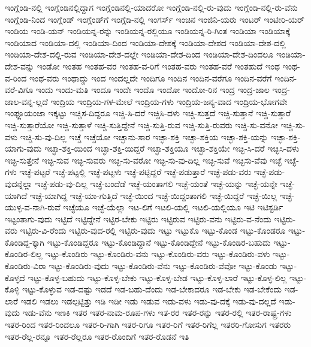 {ಇಂಗ್ಲೆಂಡಿ-ನಲ್ಲಿ
ಇಂಗ್ಲೆಂಡಿನಲ್ಲಿದ್ದಾಗ
ಇಂಗ್ಲೆಂಡಿನಲ್ಲಿ-ಯಾದರೋ
ಇಂಗ್ಲೆಂಡಿ-ನಲ್ಲಿ-ರು-ವುದು
ಇಂಗ್ಲೆಂಡಿ-ನಲ್ಲಿ-ರು-ವೆನು
ಇಂಗ್ಲೆಂಡಿ-ನಿಂದ
ಇಂಗ್ಲೆಂಡ್
ಇಂಗ್ಲೆಂಡ್‌ಗೆ
ಇಂಗ್ಲೆಡಿ-ನಲ್ಲಿ
ಇಂಗರ್ಸ್
ಇಂಚಿನ
ಇಂಜಿನಿ-ಯರು
ಇಂಟರ್
ಇಂಟೀರಿ-ಯರ್‌
ಇಂಡಿಯ
ಇಂಡಿ-ಯನ್
ಇಂಡಿಯನ್ನ-ರನ್ನು
ಇಂಡಿಯನ್ನ-ರಲ್ಲಿಯೂ
ಇಂಡಿಯನ್ನ-ರಿ-ಗಿಂತ
ಇಂಡಿಯಾ
ಇಂಡಿಯಾಕ್ಕೆ
ಇಂಡಿಯಾದ
ಇಂಡಿಯಾ-ದಲ್ಲಿ
ಇಂಡಿಯಾ-ದಿಂದ
ಇಂಡಿಯಾ-ದೇಶಕ್ಕೆ
ಇಂಡಿಯಾ-ದೇಶದ
ಇಂಡಿಯಾ-ದೇಶ-ದಲ್ಲಿ
ಇಂಡಿಯಾ-ದೇಶ-ದಲ್ಲಿ-ರುವ
ಇಂಡಿಯಾ-ದೇಶ-ದಲ್ಲೇ
ಇಂಡಿಯಾ-ದೇಶ-ದಿಂದ
ಇಂಡಿಯಾ-ದೇಶ-ದಿಂದಲೂ
ಇಂಡಿಯಾ-ದೇಶ-ವನ್ನು
ಇಂಡೋ
ಇಂತಹ
ಇಂತಹ-ವರ
ಇಂತಹ-ವ-ರಿಗೆ
ಇಂತಹ-ವರು
ಇಂತಹ-ವರೆ
ಇಂತಹುದೆ
ಇಂಥ
ಇಂಥ-ವ-ರಿಂದ
ಇಂಥ-ವರು
ಇಂಥಾದ್ದು
ಇಂದ
ಇಂದಲ್ಲದೇ
ಇಂದಿಗೂ
ಇಂದಿನ
ಇಂದಿನ-ವರೆಗೂ
ಇಂದಿನ-ವರೆಗೆ
ಇಂದಿನ-ವರೆ-ವಿಗೂ
ಇಂದು
ಇಂದು-ಮತಿ
ಇಂದೂ
ಇಂದೇ
ಇಂದೊ
ಇಂದೋ
ಇಂದೋ-ರಿನ
ಇಂದ್ರ
ಇಂದ್ರ-ಜಾಲ
ಇಂದ್ರ-ಜಾಲ-ವನ್ನ-ಲ್ಲದೆ
ಇಂದ್ರಿಯ
ಇಂದ್ರಿಯ-ಗಳ-ಮೇಲೆ
ಇಂದ್ರಿಯ-ಗಳು
ಇಂದ್ರಿಯ-ಜನ್ಯ-ವಾದ
ಇಂದ್ರಿಯ-ಭೋಗವೇ
ಇಂಫ್ಲೂಯಂಜಾ
ಇಕ್ಕಟ್ಟು
ಇಚ್ಚಿಸ-ದಿದ್ದರೂ
ಇಚ್ಚಿ-ಸಿ-ದರೆ
ಇಚ್ಚಿಸಿ-ದಳು
ಇಚ್ಚಿ-ಸುತ್ತದೆ
ಇಚ್ಚಿ-ಸುತ್ತಾನೆ
ಇಚ್ಚಿ-ಸುತ್ತಾರೆ
ಇಚ್ಚಿ-ಸುತ್ತಾರೆಯೋ
ಇಚ್ಚಿ-ಸುತ್ತಾಳೆ
ಇಚ್ಚಿ-ಸುತ್ತಿದ್ದೇನೆ
ಇಚ್ಚಿ-ಸುತ್ತಿ-ರುವ
ಇಚ್ಚಿ-ಸುತ್ತಿ-ರುವರು
ಇಚ್ಚಿ-ಸು-ವನೋ
ಇಚ್ಚಿ-ಸು-ವಳು
ಇಚ್ಚಿ-ಸು-ವು-ದಿಲ್ಲ
ಇಚ್ಚೆ
ಇಚ್ಚೆಯೋ
ಇಚ್ಛಾನು-ಸಾರ
ಇಚ್ಛಾ-ಶಕ್ತಿ
ಇಚ್ಛಾ-ಶಕ್ತಿಯ
ಇಚ್ಛಾ-ಶಕ್ತಿ-ಯನ್ನು
ಇಚ್ಛಾ-ಶಕ್ತಿ-ಯಾಗು-ವುದು
ಇಚ್ಛಾ-ಶಕ್ತಿ-ಯಿಂದ
ಇಚ್ಛಾ-ಶಕ್ತಿ-ಯಿದ್ದರೆ
ಇಚ್ಛಾ-ಶಕ್ತಿಯೂ
ಇಚ್ಛಾ-ಶಕ್ತಿಯೇ
ಇಚ್ಛಿ-ಸಿ-ದರೆ
ಇಚ್ಛಿಸಿ-ದಳು
ಇಚ್ಛಿ-ಸುತ್ತೇನೆ
ಇಚ್ಛಿ-ಸುವ
ಇಚ್ಛಿ-ಸುವರು
ಇಚ್ಛಿ-ಸು-ವರೋ
ಇಚ್ಛಿ-ಸು-ವು-ದಿಲ್ಲ
ಇಚ್ಛಿ-ಸುವೆ
ಇಚ್ಛಿಸು-ವೆವು
ಇಚ್ಛೆ
ಇಚ್ಛೆ-ಗಳು
ಇಚ್ಛೆ-ಪಟ್ಟರೆ
ಇಚ್ಛೆ-ಪಟ್ಟಲ್ಲಿ
ಇಚ್ಛೆ-ಪಟ್ಟಳು
ಇಚ್ಛೆ-ಪಟ್ಟಿದ್ದರೆ
ಇಚ್ಛೆ-ಪಡುತ್ತಾರೆ
ಇಚ್ಛೆ-ಪಡು-ವರು
ಇಚ್ಛೆ-ಪಡು-ವುದನ್ನೆಲ್ಲಾ
ಇಚ್ಛೆ-ಪಡು-ವು-ದಿಲ್ಲ
ಇಚ್ಛೆ-ಬಂದೆಡೆ
ಇಚ್ಛೆ-ಯಂತಾಗಲಿ
ಇಚ್ಛೆ-ಯಂತೆ
ಇಚ್ಛೆ-ಯನ್ನು
ಇಚ್ಛೆ-ಯನ್ನೇ
ಇಚ್ಛೆ-ಯಾಗಿದೆ
ಇಚ್ಛೆ-ಯಾಗಿದ್ದ
ಇಚ್ಛೆ-ಯಾ-ಗುತ್ತಿದೆ
ಇಚ್ಛೆ-ಯಿಂದ
ಇಚ್ಛೆ-ಯಿದ್ದಂತಾಗಲಿ
ಇಚ್ಛೆ-ಯಿದ್ದರೆ
ಇಚ್ಛೆ-ಯಿಲ್ಲ
ಇಚ್ಛೆ-ಯುಳ್ಳ-ವ-ನಾಗಿ-ರುವೆ
ಇಚ್ಛೆಯೂ
ಇಚ್ಛೆ-ಯೆಲ್ಲಾ
ಇಟ-ಲಿಗೆ
ಇಟಲಿ-ಯಲ್ಲಿ
ಇಟಲಿ-ಯಲ್ಲಿಯೂ
ಇಟಿ
ಇಟಿಸ್ಟರ್ಡಿ
ಇಟ್ಟಂತಾಗು-ವುದು
ಇಟ್ಟಿದೆ
ಇಟ್ಟಿದ್ದೇನೆ
ಇಟ್ಟಿರ-ಬೇಕು
ಇಟ್ಟಿರು
ಇಟ್ಟಿರುವ
ಇಟ್ಟಿರು-ವನು
ಇಟ್ಟಿರು-ವ-ನೆಂದು
ಇಟ್ಟಿರು-ವರು
ಇಟ್ಟಿರು-ವಿ-ರೆಂದು
ಇಟ್ಟಿರು-ವುದ-ರಲ್ಲಿ
ಇಟ್ಟಿರು-ವುದು
ಇಟ್ಟು
ಇಟ್ಟುಕೊ
ಇಟ್ಟು-ಕೊಂಡ
ಇಟ್ಟು-ಕೊಂಡರೂ
ಇಟ್ಟು-ಕೊಂಡಿದ್ದ-ಕ್ಕಾಗಿ
ಇಟ್ಟು-ಕೊಂಡಿದ್ದರೂ
ಇಟ್ಟು-ಕೊಂಡಿದ್ದಾನೆ
ಇಟ್ಟು-ಕೊಂಡಿದ್ದೇನೆ
ಇಟ್ಟು-ಕೊಂಡಿರ-ಬಹುದು
ಇಟ್ಟು-ಕೊಂಡಿರ-ಲಿಲ್ಲ
ಇಟ್ಟು-ಕೊಂಡಿರು
ಇಟ್ಟು-ಕೊಂಡಿರು-ವನು
ಇಟ್ಟು-ಕೊಂಡಿರು-ವರು
ಇಟ್ಟು-ಕೊಂಡಿರು-ವಳು
ಇಟ್ಟು-ಕೊಂಡಿರು-ವಿರಾ
ಇಟ್ಟು-ಕೊಂಡಿರು-ವುದು
ಇಟ್ಟು-ಕೊಂಡಿರು-ವೆನು
ಇಟ್ಟು-ಕೊಂಡಿರು-ವೆವೋ
ಇಟ್ಟು-ಕೊಂಡು
ಇಟ್ಟು-ಕೊಳ್ಳದೆ
ಇಟ್ಟು-ಕೊಳ್ಳ-ಬಹುದು
ಇಟ್ಟು-ಕೊಳ್ಳ-ಬೇಕು
ಇಟ್ಟು-ಕೊಳ್ಳ-ಬೇಡ
ಇಟ್ಟು-ಕೊಳ್ಳ-ಲಾರೆ
ಇಟ್ಟು-ಕೊಳ್ಳ-ಲಿಲ್ಲ
ಇಟ್ಟು-ಕೊಳ್ಳಿ
ಇಟ್ಟು-ಕೊಳ್ಳುವ
ಇಡ-ದಷ್ಟು
ಇಡದೆ
ಇಡ-ಬಹು-ದೆಂದು
ಇಡ-ಬೇಕಾದರೂ
ಇಡ-ಬೇಕು
ಇಡ-ಬೇಕೆಂದು
ಇಡ-ಲಾರೆ
ಇಡಲಿ
ಇಡಲು
ಇಡಲ್ಪಟ್ಟಿತ್ತು
ಇಡಿ
ಇಡೀ
ಇಡು
ಇಡುವ
ಇಡು-ವಳು
ಇಡು-ವು-ದಕ್ಕೆ
ಇಡು-ವು-ದಲ್ಲದೆ
ಇಡು-ವುದು
ಇಡು-ವೆನು
ಇಣಕಿ
ಇತರ
ಇತರ-ನಾಮ-ರೂಪ-ಗಳು
ಇತ-ರರ
ಇತರ-ರನ್ನು
ಇತರ-ರಲ್ಲಿ
ಇತರ-ರಾಷ್ಟ್ರ-ಗಳು
ಇತರ-ರಿಂದ
ಇತರ-ರಿಂದಲೂ
ಇತರ-ರಿ-ಗಾಗಿ
ಇತರ-ರಿಗೂ
ಇತರ-ರಿಗೆ
ಇತರ-ರಿಗೆಲ್ಲ
ಇತರರಿ-ಗೋಸುಗ
ಇತರರು
ಇತರ-ರೆಲ್ಲ-ರನ್ನೂ
ಇತರ-ರೆಲ್ಲರೂ
ಇತರ-ರೊಂದಿಗೆ
ಇತರ-ರೊಡನೆ
ಇತಿ
}
